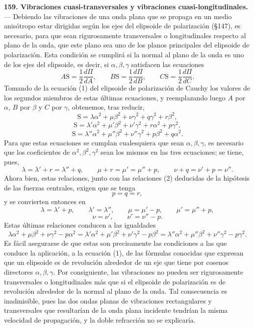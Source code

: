 \noindent\textbf{159. Vibraciones cuasi-transversales y vibraciones
cuasi-longitudinales.} — Debiendo las vibraciones de una onda plana que se
propaga en un medio anisótropo estar dirigidas según los ejes del
elipsoide de polarización (§147), es necesario, para que sean
rigurosamente transversales o longitudinales respecto al plano de la onda,
que este plano sea uno de los planos principales del elipsoide de
polarización. Esta condición se cumplirá si la normal al plano de la onda
es uno de los ejes del elipsoide, es decir, si $\alpha,\beta,\gamma$
satisfacen las ecuaciones
\[
A\mathrm S=\frac{1}{2}\frac{d\Pi}{dA},\qquad
B\mathrm S=\frac{1}{2}\frac{d\Pi}{dB},\qquad
C\mathrm S=\frac{1}{2}\frac{d\Pi}{dC}.
\]
Tomando de la ecuación (1) del elipsoide de polarización de Cauchy los
valores de los segundos miembros de estas últimas ecuaciones, y
reemplazando luego $A$ por $\alpha$, $B$ por $\beta$ y $C$ por $\gamma$,
obtenemos, tras reducir,
\[
\mathrm S=\lambda\alpha^2+\mu\beta^2+\nu\gamma^2+q\gamma^2+r\beta^2,
\]
\[
\mathrm S=\lambda'\alpha^2+\mu'\beta^2+\nu'\gamma^2+r\alpha^2+p\gamma^2,
\]
\[
\mathrm S=\lambda''\alpha^2+\mu''\beta^2+\nu''\gamma^2+p\beta^2+q\alpha^2.
\]
Para que estas ecuaciones se cumplan cualesquiera que sean
$\alpha,\beta,\gamma$, es necesario que los coeficientes de
$\alpha^2,\beta^2,\gamma^2$ sean los mismos en las tres ecuaciones; se
tiene, pues,
\[
\lambda=\lambda'+r=\lambda''+q,\qquad
\mu+r=\mu'=\mu''+p,\qquad
\nu+q=\nu'+p=\nu''.
\]
Ahora bien, estas relaciones, junto con las relaciones (2) deducidas de la
hipótesis de las fuerzas centrales, exigen que se tenga
\[
p=q=r,
\]
y se convierten entonces en
\[
\lambda=\lambda'+p,\qquad \lambda'=\lambda'',\qquad
\mu=\mu'-p,\qquad \mu'=\mu''+p,
\]
\[
\nu=\nu',\qquad \nu'=\nu''-p.
\]
Estas últimas relaciones conducen a las igualdades
\[
\lambda\alpha^2+\mu\beta^2+\nu\gamma^2-p\alpha^2
=\lambda'\alpha^2+\mu'\beta^2+\nu'\gamma^2-p\beta^2
=\lambda''\alpha^2+\mu''\beta^2+\nu''\gamma^2-p\gamma^2.
\]
Es fácil asegurarse de que estas son precisamente las condiciones a las
que conduce la aplicación, a la ecuación (1), de las fórmulas conocidas
que expresan que un elipsoide es de revolución alrededor de un eje que
tiene por cosenos directores $\alpha,\beta,\gamma$. Por consiguiente, las
vibraciones no pueden ser rigurosamente transversales o longitudinales más
que si el elipsoide de polarización es de revolución alrededor de la
normal al plano de la onda. Tal consecuencia es inadmisible, pues las dos
ondas planas de vibraciones rectangulares y transversales que resultarían
de la onda plana incidente tendrían la misma velocidad de propagación, y
la doble refracción no se explicaría.

